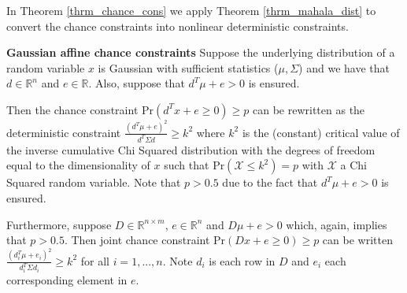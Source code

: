 In Theorem \ref{thrm_chance_cons} we apply Theorem \ref{thrm_mahala_dist} to convert the chance constraints into nonlinear deterministic constraints.
\begin{thrm}
\textbf{Gaussian affine chance constraints} Suppose the underlying distribution of a random variable $x$ is Gaussian with sufficient statistics ($\mu, \Sigma$) and we have that $d \in \mathbb{R}^{n}$ and $e \in \mathbb{R}$. Also, suppose that $d^T\mu+e>0$ is ensured.

Then the chance constraint $\text{Pr}(d^Tx + e \geq 0) \geq p$ can be rewritten as the deterministic constraint $\frac{(d^T\mu+e)^2}{d^T \Sigma d} \geq k^2$ where $k^2$ is the (constant) critical value of the inverse cumulative Chi Squared distribution with the degrees of freedom equal to the dimensionality of $x$ such that $\text{Pr}(\mathcal{X} \leq k^2) = p$ with $\mathcal{X}$ a Chi Squared random variable. Note that $p > 0.5$ due to the fact that $d^T\mu+e>0$ is ensured.

Furthermore, suppose $D \in \mathbb{R}^{n\times m}$, $e \in \mathbb{R}^n$ and $D\mu + e >0$ which, again, implies that $p > 0.5$. Then joint chance constraint $\text{Pr}(Dx + e \geq 0) \geq p$ can be written $\frac{(d^T_i\mu+e_i)^2}{d_i^T \Sigma d_i} \geq k^2$ for all $i=1,...,n$. Note $d_i$ is each row in $D$ and $e_i$ each corresponding element in $e$.
\label{thrm_chance_cons}
\end{thrm}
